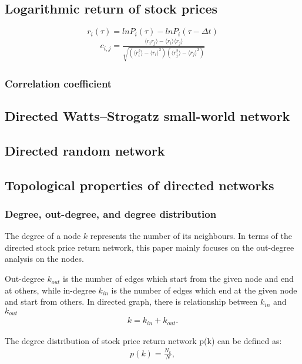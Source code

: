 \subsection{Logarithmic return of stock prices}
$$r_i(\tau)=lnP_i(\tau)-lnP_i(\tau-\Delta t)$$
\begin{eqnarray}\label{equ:corr}
c_{i,j}=\frac{\langle r_ir_j \rangle-\langle r_i\rangle \langle r_j\rangle}{\sqrt{(\langle r_i^2\rangle-\langle r_i\rangle^2)(\langle r_j^2\rangle-\langle r_j\rangle^2)}}
\end{eqnarray}
\subsubsection{Correlation coefficient}


\subsection{Directed Watts–Strogatz small-world network}



\subsection{Directed random network}

\subsection{Topological properties of directed networks}
\label{sec:aim}
\subsubsection{Degree, out-degree, and degree distribution}
The degree of a node $k$ represents the number of its neighbours. In terms of the directed stock price return network, this paper mainly focuses on the out-degree analysis on the nodes.

Out-degree $k_{out}$ is the number of edges which start from the given node and end at others, while in-degree $k_{in}$ is the number of edges which end at the given node and start from others. In directed graph, there is relationship between $k_{in}$ and $k_{out}$
\begin{eqnarray}
k=k_{in}+k_{out}.
\end{eqnarray}

The degree distribution of stock price return network p(k) can be defined as:
\begin{eqnarray}
p(k)=\frac{N_k}{N},
\end{eqnarray}

